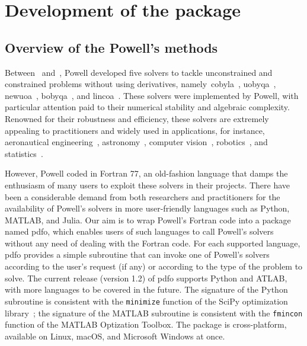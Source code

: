 %
%
%
\chapter{Development of the  package}
\label{ch:pdfo}

\section{Overview of the Powell's  methods}
\label{sec:powell}

Between~\citeyear{Powell_1994} and~\citeyear{Powell_2015}, Powell developed five solvers to tackle unconstrained and constrained problems without using derivatives,
namely~\gls{cobyla}~\cite{Powell_1994}, \gls{uobyqa}~\cite{Powell_2002}, \gls{newuoa}~\cite{Powell_2006}, \gls{bobyqa}~\cite{Powell_2009}, and \gls{lincoa}~\cite{Powell_2015}.
These solvers were implemented by Powell, with particular attention paid to their numerical stability and algebraic complexity.
Renowned for their robustness and efficiency, these solvers are extremely appealing to practitioners and widely used in applications, for instance, aeronautical engineering~\cite{Gallard_Etal_2018}, astronomy~\cite{Biviano_Etal_2013,Mamon_Biviano_Boue_2013}, computer vision~\cite{Izadinia_Shan_Seitz_2017}, robotics~\cite{Mombaur_Truong_Laumond_2010}, and statistics~\cite{Bates_Etal_2015}.

However, Powell coded in Fortran 77, an old-fashion language that damps the enthusiasm of many users to exploit these solvers in their projects.
There have been a considerable demand from both researchers and practitioners for the availability of Powell's solvers in more user-friendly languages such as Python, MATLAB, and Julia.
Our aim is to wrap Powell's Fortran code into a package named \gls{pdfo}, which enables users of such languages to call Powell's solvers without any need of dealing with the Fortran code.
For each supported language, \gls{pdfo} provides a simple subroutine that can invoke one of Powell's solvers according to the user's request (if any) or according to the type of the problem to solve. The current release (version 1.2) of \gls{pdfo} supports Python and ATLAB, with more languages to be covered in the future.
The signature of the Python subroutine is consistent with the \texttt{minimize} function of the SciPy optimization library~\cite{Virtanen_Etal_2020};
the signature of the MATLAB subroutine is consistent with the \texttt{fmincon} function of the MATLAB Optization Toolbox.
The package is cross-platform, available on Linux, macOS, and Microsoft Windows at once.

